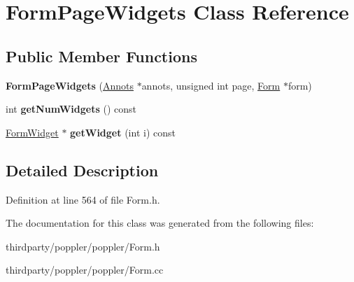 \hypertarget{class_form_page_widgets}{}\section{Form\+Page\+Widgets Class Reference}
\label{class_form_page_widgets}
\subsection*{Public Member Functions}
\begin{DoxyCompactItemize}
\item 
\mbox{\label{class_form_page_widgets_ae990241b973708f846514893301e178a}} 
{\bfseries Form\+Page\+Widgets} (\hyperlink{class_annots}{Annots} $\ast$annots, unsigned int page, \hyperlink{class_form}{Form} $\ast$form)
\item 
\mbox{\label{class_form_page_widgets_abab1a7d4a80b61797d5fce081917f9e3}} 
int {\bfseries get\+Num\+Widgets} () const
\item 
\mbox{\label{class_form_page_widgets_a4f7cffbf72703cfdd92332c59f6ca0c2}} 
\hyperlink{class_form_widget}{Form\+Widget} $\ast$ {\bfseries get\+Widget} (int i) const
\end{DoxyCompactItemize}


\subsection{Detailed Description}


Definition at line 564 of file Form.\+h.



The documentation for this class was generated from the following files\+:\begin{DoxyCompactItemize}
\item 
thirdparty/poppler/poppler/Form.\+h\item 
thirdparty/poppler/poppler/Form.\+cc\end{DoxyCompactItemize}
